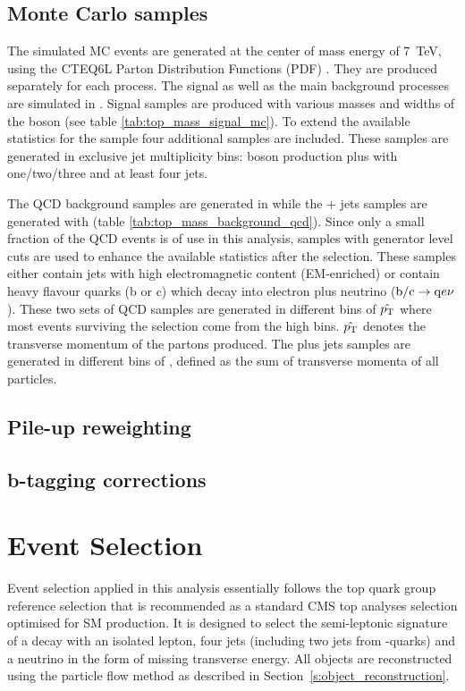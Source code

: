 \subsection{Monte Carlo samples}
The simulated MC events are generated at the center of mass energy of \SI{7}{\TeV}, using the CTEQ6L Parton Distribution
Functions (PDF) \autocite{CTEQ}. They are produced separately for each process. The \zp signal as well as the main
background processes are simulated in \MADGRAPH. Signal samples are produced with various masses and widths of the \zp
boson (see table \ref{tab:top_mass_signal_mc}). To extend the available statistics for the \WpJets sample four
additional \WpJets samples are included. These samples are generated in exclusive jet multiplicity bins: \W boson
production plus with one/two/three and at least four jets.

The QCD background samples are generated in \PYTHIA while the \photon + jets samples are generated with \MADGRAPH (table
\ref{tab:top_mass_background_qcd}). Since only a small fraction of the QCD \multijet events is of use in this analysis,
samples with generator level cuts are used to enhance the available statistics after the selection. These samples either
contain jets with high electromagnetic content (EM-enriched) or contain heavy flavour quarks (b or c) which decay into
electron plus neutrino ($\mathrm{b}/\mathrm{c} \rightarrow \mathrm{q} e\nu$). These two sets of QCD samples are generated in different
bins of $\hat{p_{\mathrm{T}}}$ where most events surviving the selection come from the high bins. $\hat{p_{\mathrm{T}}}$ denotes the transverse
momentum of the partons produced. The \photon plus jets samples are generated in different bins of \HT, defined as the
sum of transverse momenta of all particles.



\clearpage

\subsection{Pile-up reweighting}
\label{ss_top_mass:pileup_reweithing}

\subsection{b-tagging corrections}
\label{ss_top_mass:btagging_corrections}

\section{Event Selection}
\label{s_top_mass:event_selection}
Event selection applied in this analysis essentially follows the top quark group reference selection that is recommended
as a standard CMS top analyses selection optimised for SM \ttbar production. It is designed to select the semi-leptonic
signature of a \ttbar decay with an isolated lepton, four jets (including two jets from \cPqb-quarks) and a neutrino in
the form of missing transverse energy. All objects are reconstructed using the particle flow method as described in
Section~\ref{s:object_reconstruction}.

